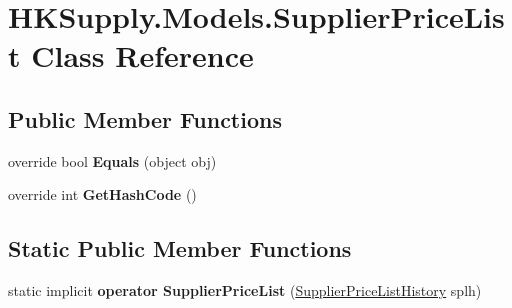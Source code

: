 \hypertarget{class_h_k_supply_1_1_models_1_1_supplier_price_list}{}\section{H\+K\+Supply.\+Models.\+Supplier\+Price\+List Class Reference}
\label{class_h_k_supply_1_1_models_1_1_supplier_price_list}
\subsection*{Public Member Functions}
\begin{DoxyCompactItemize}
\item 
\mbox{\label{class_h_k_supply_1_1_models_1_1_supplier_price_list_a419c007846e5e8e695fbf7beff5364c3}} 
override bool {\bfseries Equals} (object obj)
\item 
\mbox{\label{class_h_k_supply_1_1_models_1_1_supplier_price_list_a54abf20a5deba6240b401eb12080a273}} 
override int {\bfseries Get\+Hash\+Code} ()
\end{DoxyCompactItemize}
\subsection*{Static Public Member Functions}
\begin{DoxyCompactItemize}
\item 
\mbox{\label{class_h_k_supply_1_1_models_1_1_supplier_price_list_a003e60603458e25bd9e0991d44275b53}} 
static implicit {\bfseries operator Supplier\+Price\+List} (\mbox{\hyperlink{class_h_k_supply_1_1_models_1_1_supplier_price_list_history}{Supplier\+Price\+List\+History}} splh)
\end{DoxyCompactItemize}
